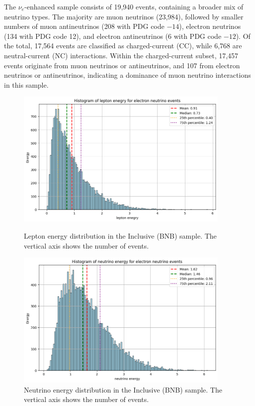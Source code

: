 \documentclass{pracalicmgr}
\begin{document}
The $\nu_e$-enhanced sample consists of 19,940 events, containing a broader mix of neutrino types. The majority are muon neutrinos (23,984), followed by smaller numbers of muon antineutrinos (208 with PDG code $-14$), electron neutrinos (134 with PDG code 12), and electron antineutrinos (6 with PDG code $-12$). Of the total, 17,564 events are classified as charged-current (CC), while 6,768 are neutral-current (NC) interactions. Within the charged-current subset, 17,457 events originate from muon neutrinos or antineutrinos, and 107 from electron neutrinos or antineutrinos, indicating a dominance of muon neutrino interactions in this sample.

\begin{figure}[H]
    \centering
    \begin{minipage}[t]{\textwidth}
        \centering
        \includegraphics[width=0.92\textwidth]{src/leptonMuon.png}
        \caption{Lepton energy distribution in the Inclusive (BNB) sample. The vertical axis shows the number of events.}
        \label{fig:lepton-inclusive}
    \end{minipage}
    \begin{minipage}[t]{\textwidth}
        \centering
        \includegraphics[width=0.92\textwidth]{src/neutrinoMuon.png}
        \caption{Neutrino energy distribution in the Inclusive (BNB) sample. The vertical axis shows the number of events.}
        \label{fig:neutrino-inclusive}
    \end{minipage}
\end{figure}
\end{document}
